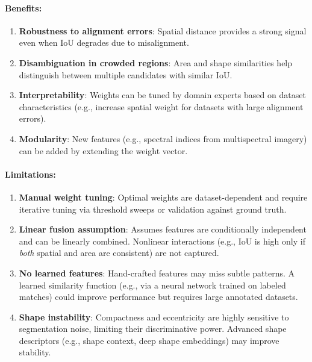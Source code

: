 \paragraph{Benefits:}
\begin{enumerate}
    \item \textbf{Robustness to alignment errors}: Spatial distance provides a strong signal even when IoU degrades due to misalignment.
    \item \textbf{Disambiguation in crowded regions}: Area and shape similarities help distinguish between multiple candidates with similar IoU.
    \item \textbf{Interpretability}: Weights can be tuned by domain experts based on dataset characteristics (e.g., increase spatial weight for datasets with large alignment errors).
    \item \textbf{Modularity}: New features (e.g., spectral indices from multispectral imagery) can be added by extending the weight vector.
\end{enumerate}

\paragraph{Limitations:}
\begin{enumerate}
    \item \textbf{Manual weight tuning}: Optimal weights are dataset-dependent and require iterative tuning via threshold sweeps or validation against ground truth.
    \item \textbf{Linear fusion assumption}: Assumes features are conditionally independent and can be linearly combined. Nonlinear interactions (e.g., IoU is high only if \emph{both} spatial and area are consistent) are not captured.
    \item \textbf{No learned features}: Hand-crafted features may miss subtle patterns. A learned similarity function (e.g., via a neural network trained on labeled matches) could improve performance but requires large annotated datasets.
    \item \textbf{Shape instability}: Compactness and eccentricity are highly sensitive to segmentation noise, limiting their discriminative power. Advanced shape descriptors (e.g., shape context, deep shape embeddings) may improve stability.
\end{enumerate}

